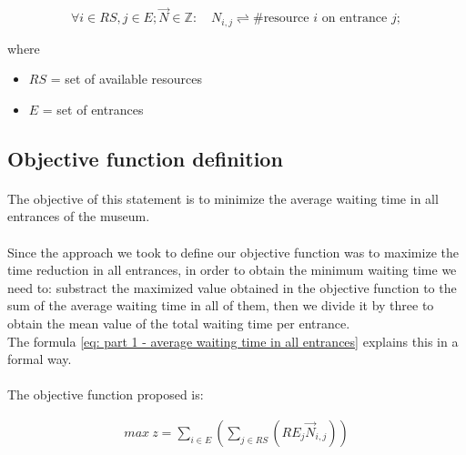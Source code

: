 \begin{equation}\label{eq: part 2 - decision variables}
    \forall i \in RS, j \in E; \vec{N} \in \mathbb{Z}:
    \quad
    N_{i,j} \rightleftharpoons \text{\# resource } i \text{ on entrance } j;
\end{equation}

where

\begin{itemize}
    \item[] $RS$ = set of available resources
    \item[] $E$ = set of entrances
\end{itemize}







\subsection{Objective function definition}

\paragraph{}
The objective of this statement is to minimize the average waiting time in all entrances of the museum.

\paragraph{}
Since the approach we took to define our objective function was to maximize the time reduction in all entrances, in order to obtain the minimum waiting time we need to:
substract the maximized value obtained in the objective function to the sum of the average waiting time in all of them, then we divide it by three to obtain the mean value of the total waiting time per entrance.\\
The formula \ref{eq: part 1 - average waiting time in all entrances} explains this in a formal way.


\paragraph{}
The objective function proposed is:

\begin{equation}\label{eq: part 1 - objective function}
    \begin{aligned}
        max\ z = \sum_{i \in E}\left({\sum_{j \in RS}\left({RE_j \vec{N}_{i,j}}\right)}\right)
    \end{aligned}
\end{equation}

